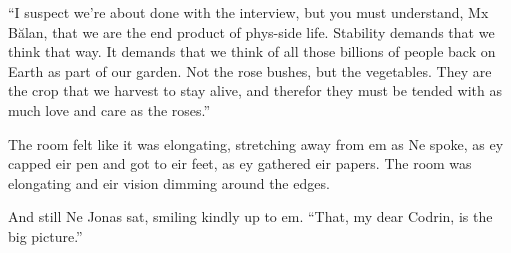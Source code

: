 ``I suspect we're about done with the interview, but you must understand, Mx Bălan, that we are the end product of phys-side life. Stability demands that we think that way. It demands that we think of all those billions of people back on Earth as part of our garden. Not the rose bushes, but the vegetables. They are the crop that we harvest to stay alive, and therefor they must be tended with as much love and care as the roses.''

The room felt like it was elongating, stretching away from em as Ne spoke, as ey capped eir pen and got to eir feet, as ey gathered eir papers. The room was elongating and eir vision dimming around the edges.

And still Ne Jonas sat, smiling kindly up to em. ``That, my dear Codrin, is the big picture.''
